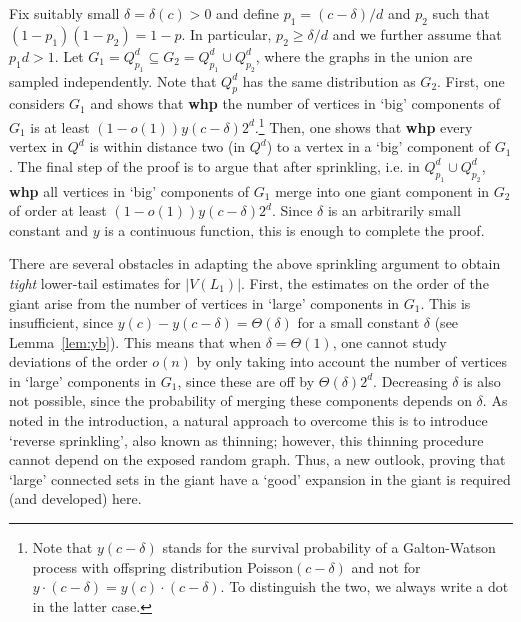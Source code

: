 \documentclass[reqno,final,a4paper]{amsart}
\theoremstyle{definition}
\newcommand{\1}{\mathbbm{1}}
\begin{document}
Fix suitably small $\delta=\delta(c)>0$ and define $p_1 = (c-\delta)/d$ and $p_2$ such that $(1-p_1)(1-p_2)=1-p$. In particular, $p_2\ge \delta/d$ and we further assume that $p_1d>1$. Let $G_1=Q^d_{p_1}\subseteq G_2=Q^d_{p_1}\cup Q^d_{p_2}$, where the graphs in the union are sampled independently. Note that $Q^d_p$ has the same distribution as $G_2$. 
First, one considers $G_1$ and shows that \textbf{whp} the number of vertices in `big' components of $G_1$ is at least $(1-o(1))y(c-\delta)2^d$.\footnote{Note that $y(c-\delta)$ stands for the survival probability of a Galton-Watson process with offspring distribution Poisson$(c-\delta)$ and not for $y\cdot (c-\delta) = y(c)\cdot (c-\delta)$. To distinguish the two, we always write a dot in the latter case.} 
Then, one shows that \textbf{whp} every vertex in $Q^d$ is within distance two (in $Q^d$) to a vertex in a `big' component of $G_1$. 
The final step of the proof is to argue that after sprinkling, i.e. in $Q^d_{p_1}\cup Q^d_{p_2}$, \textbf{whp} all vertices in `big' components of $G_1$ merge into one giant component in $G_2$ of order at least $(1-o(1))y(c-\delta)2^d$. Since $\delta$ is an arbitrarily small constant and $y$ is a continuous function, this is enough to complete the proof. 

There are several obstacles in adapting the above sprinkling argument to obtain \textit{tight} lower-tail estimates for $|V(L_1)|$. First, the estimates on the order of the giant arise from the number of vertices in `large' components in $G_1$. 
This is insufficient, since $y(c)-y(c-\delta)=\Theta(\delta)$ for a small constant $\delta$ (see Lemma~\ref{lem:yb}). This means that when $\delta=\Theta(1)$, one cannot study deviations of the order $o(n)$ by only taking into account the number of vertices in `large' components in $G_1$, since these are off by $\Theta(\delta)2^d$. Decreasing $\delta$ is also not possible, since the probability of merging these components depends on $\delta$. As noted in the introduction, a natural approach to overcome this is to introduce `reverse sprinkling', also known as thinning; however, this thinning procedure cannot depend on the exposed random graph. Thus, a new outlook, proving that `large' connected sets in the giant have a `good' expansion in the giant is required (and developed) here.
\end{document}
